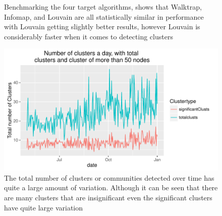 \begin{figure}[ht]
\centering
{}


\caption[Cluster Family Load Profiles]{ Benchmarking the four target algorithms, shows that Walktrap, Infomap, and Louvain are all statistically similar in performance with Louvain getting slightly better results, however Louvain is considerably faster when it comes to detecting clusters}
\label{fig:ChooseAlg}
\end{figure}



\begin{figure}[ht]
    \centering
    \includegraphics[width=\textwidth]{Figures/Results/TotalClusters}
    \caption[Total clusters over time]{The total number of clusters or communities detected over time has quite a large amount of variation. Although it can be seen that there are many clusters that are insignificant even the significant clusters have quite large variation }
    \label{fig:Total_Clusters}
\end{figure}

